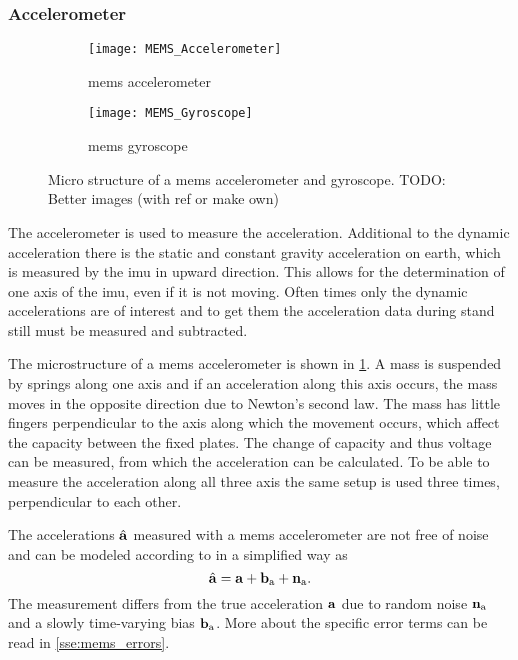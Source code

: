 \subsubsection{ Accelerometer}
\begin{figure}[htb]
	\centering
	\begin{subfigure}{0.48\textwidth}
		\centering
		\texttt{[image: MEMS\_Accelerometer]}
		\caption{\acrshort{mems} accelerometer}
		\label{fig:MEMS_Accelerometer}
	\end{subfigure}
	\begin{subfigure}{0.48\textwidth}
		\centering
		\texttt{[image: MEMS\_Gyroscope]}
		\caption{\acrshort{mems} gyroscope}
		\label{fig:MEMS_Gyroscope}
	\end{subfigure}
	\caption[Micro structure of a \acrshort{mems} accelerometer and gyroscope]{Micro structure of a \acrshort{mems} accelerometer and gyroscope. \color{red}TODO: Better images (with ref or make own)}
	\label{fig:MEMS_design}
\end{figure}
The accelerometer is used to measure the acceleration.
Additional to the dynamic acceleration there is the static and constant gravity acceleration on earth, which is measured by the \gls{imu} in upward direction.
This allows for the determination of one axis of the \gls{imu}, even if it is not moving.
Often times only the dynamic accelerations are of interest and to get them the acceleration data during stand still must be measured and subtracted.\par
The microstructure of a \gls{mems} accelerometer is shown in \cref{fig:MEMS_Accelerometer}.
A mass is suspended by springs along one axis and if an acceleration along this axis occurs, the mass moves in the opposite direction due to Newton's second law.
The mass has little fingers perpendicular to the axis along which the movement occurs, which affect the capacity between the fixed plates.
The change of capacity and thus voltage can be measured, from which the acceleration can be calculated.
To be able to measure the acceleration along all three axis the same setup is used three times, perpendicular to each other.\par
The accelerations $\hat{\vb{a}}$ measured with a \gls{mems} accelerometer are not free of noise and can be modeled according to \cite{Lefferts1982} in a simplified way as
\begin{equation}
	\hat{\vb{a}} = \vb{a} + \vb{b}_\mathrm{a} + \vb{n}_\mathrm{a}.
\end{equation}
The measurement differs from the true acceleration $\vb{a}$ due to random noise $\vb{n}_\mathrm{a}$ and a slowly time-varying bias $\vb{b}_\mathrm{a}$.
More about the specific error terms can be read in \cref{sse:mems_errors}.

